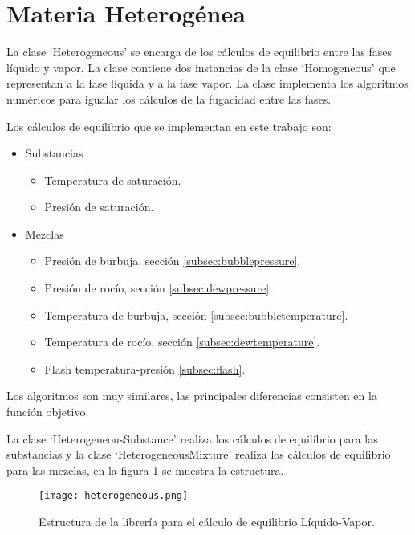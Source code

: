 \section{Materia Heterogénea}\label{sec:heterogeneous}

	La clase `Heterogeneous' se encarga de los cálculos de equilibrio entre las fases líquido y vapor. La clase contiene dos instancias de la clase `Homogeneous' que representan a la fase líquida y a la fase vapor. La clase implementa los algoritmos numéricos para igualar los cálculos de la fugacidad entre las fases.

	Los cálculos de equilibrio que se implementan en este trabajo son:

	\begin{itemize}\itemsep0ex

		\item Substancias
			\begin{itemize}\itemsep0ex
				\item Temperatura de saturación.
				\item Presión de saturación.
			\end{itemize}

		\item Mezclas
	\begin{itemize}\itemsep0ex
		\item Presión de burbuja, sección \ref{subsec:bubblepressure}.
		\item Presión de rocío, sección \ref{subsec:dewpressure}.
		\item Temperatura de burbuja, sección \ref{subsec:bubbletemperature}.
		\item Temperatura de rocío, sección \ref{subsec:dewtemperature}.
		\item Flash temperatura-presión \ref{subsec:flash}.
	\end{itemize}

	\end{itemize}

	Los algoritmos son muy similares, las principales diferencias consisten en la función objetivo.

	La clase `HeterogeneousSubstance' realiza los cálculos de equilibrio para las substancias y la clase `HeterogeneousMixture' realiza los cálculos de equilibrio para las mezclas, en la figura \ref{fig:heterogeneous} se muestra la estructura.

\begin{figure}[!h]
  \centering
    \texttt{[image: heterogeneous.png]}
    \caption{Estructura de la librería para el cálculo de equilibrio Líquido-Vapor.}
    \label{fig:heterogeneous}
\end{figure}

